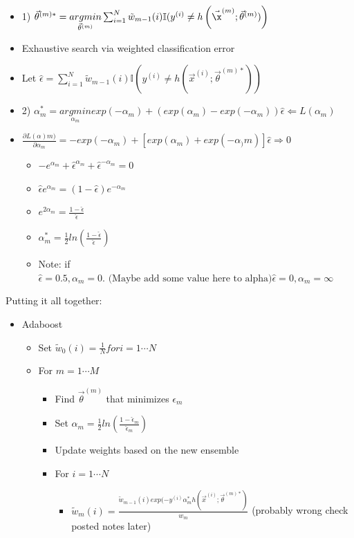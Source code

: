 \documentclass[10pt, oneside]{article}
\begin{document}
\begin{itemize}
    \begin{itemize}
        \item 1) $\vec \theta^{(m)*} = \underset{\vec \theta^{(m)}}{argmin} \sum_{i=1}^N \tilde w_{m-1} (i) \mathbb{I}(y^{(i)} \neq h\left(\vec \x^{(m)} ; \vec \theta^{(m)})\right)$
        \item Exhaustive search via weighted classification error
        \item Let $\hat \epsilon = \sum_{i=1}^N \tilde w_{m-1}(i)\mathbb{I} \left(y^{(i)} \neq h(\vec x^{(i)} ; \vec \theta^{(m)*})\right)$
        \item 2) $\alpha_m^* = \underset{\alpha_m}{argmin} exp(-\alpha_m) + (exp(\alpha_m) - exp(-\alpha_m))\hat \epsilon \Leftarrow L(\alpha_m)$
        \item $\frac{\partial L(\alpha)m)}{\partial \alpha_m} = -exp(-\alpha_m) + [exp(\alpha_m) + exp(-\alpha_)m)] \hat \epsilon \Rightarrow 0$
        \begin{itemize}
            \item $-e^{\alpha_m } + \hat \epsilon^{\alpha_m} + \hat \epsilon^{-\alpha_m} = 0$
            \item $\hat \epsilon e^{\alpha_m} = (1-\hat \epsilon) e^{-\alpha_m}$
            \item $e^{2\alpha_m} = \frac{1-\hat \epsilon}{\hat \epsilon}$
            \item $\alpha_m ^* = \frac{1}{2}ln(\frac{1-\hat \epsilon}{\hat \epsilon})$
            \item Note: if $\hat \epsilon = 0.5, \alpha_m = 0. \text{ (Maybe add some value here to alpha)} \hat \epsilon = 0, \alpha_m = \infty$
        \end{itemize}
    \end{itemize}
\end{itemize}
Putting it all together:
\begin{itemize}
    \item Adaboost
    \begin{itemize}
        \item Set $\tilde w_0 (i) = \frac{1}{N} for i=1\cdots N$
        \item For $m=1\cdots M$
        \begin{itemize}
            \item Find $\vec \theta^{(m)}$ that minimizes $\epsilon_m$
            \item Set $\alpha_m = \frac{1}{2} ln(\frac{1-\hat \epsilon_m}{\hat \epsilon_m})$
            \item Update weights based on the new ensemble
            \item For $i=1\cdots N$
            \begin{itemize}
                \item $\tilde w_m (i) = \frac{\tilde w_{m-1} (i) exp(-y^{(i)} \alpha_m ^* h(\vec x^{(i)} ; \vec \theta^{(m)*})}{w_m}$ (probably wrong check posted notes later)
            \end{itemize}
        \end{itemize}
    \end{itemize}
\end{itemize}


\end{document}
